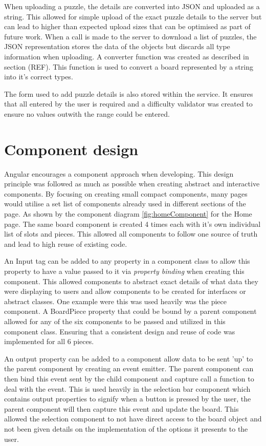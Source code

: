 \documentclass{l4proj}
\begin{document}
When uploading a puzzle, the details are converted into JSON and uploaded as a string. This allowed for simple upload of the exact puzzle details to the server but can lead to higher than expected upload sizes that can be optimised as part of future work. When a call is made to the server to download a list of puzzles, the JSON representation stores the data of the objects but discards all type information when uploading. A converter function was created as described in section (REF). This function is used to convert a board represented by a string into it's correct types.

The form used to add puzzle details is also stored within the service. It ensures that all entered by the user is required and a difficulty validator was created to ensure no values outwith the range could be entered. 

\section{Component design}
Angular encourages a component approach when developing. This design principle was followed as much as possible when creating abstract and interactive components. By focusing on creating small compact components, many pages would utilise a set list of components already used in different sections of the page. As shown by the component diagram \ref{fig:homeComponent} for the Home page. The same board component is created 4 times each with it's own individual list of slots and pieces. This allowed all components to follow one source of truth and lead to high reuse of existing code. 

An Input tag can be added to any property in a component class to allow this property to have a value passed to it via \emph{property binding} when creating this component. This allowed components to abstract exact details of what data they were displaying to users and allow components to be created for interfaces or abstract classes. One example were this was used heavily was the piece component. A BoardPiece property that could be bound by a parent component allowed for any of the six components to be passed and utilized in this component class. Ensuring that a consistent design and reuse of code was implemented for all 6 pieces. 

An output property can be added to a component allow data to be sent 'up' to the parent component by creating an event emitter. The parent component can then bind this event sent by the child component and capture call a function to deal with the event. This is used heavily in the selection bar component which contains output properties to signify when a button is pressed by the user, the parent component will then capture this event and update the board. This allowed the selection component to not have direct access to the board object and not been given details on the implementation of the options it presents to the user. 
\end{document}
